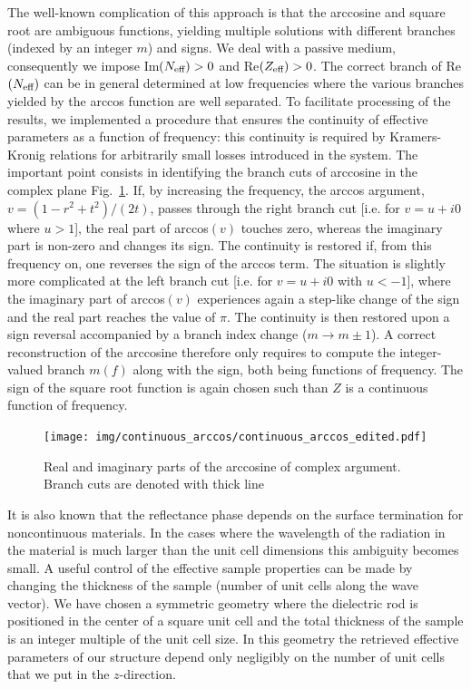 \documentclass[letterpaper,12pt]{report}
\begin{document}
The well-known complication of this approach is that the arccosine and square root are
ambiguous functions, yielding multiple solutions with different branches (indexed by an
integer $m$) and signs. We deal with a passive medium, consequently we impose
Im$(N_{\text{eff} })>0$ and Re$(Z_{\text{eff} })>0$. The correct branch of Re$(N_{\text{eff} })$ can be in general
determined at low frequencies where the various branches yielded by the arccos function
are well separated. To facilitate processing of the results, we implemented a procedure
that ensures the continuity of effective parameters as a function of frequency: this
continuity is required by Kramers-Kronig relations for arbitrarily small losses
introduced in the system. The important point consists in identifying the branch cuts of
arccosine in the complex plane Fig.\ \ref{fg_arccos}. If, by increasing the frequency,
the arccos argument, $v = (1 - r^2+t^2)/(2 t)$, 
passes through the right branch cut [i.e.
for $v= u+i 0$ where $u>1$], the real part of arccos$(v)$ touches zero, whereas the
imaginary part is non-zero and changes its sign. The continuity is restored if, from this
frequency on, one reverses the sign of the arccos term. The situation is slightly more
complicated at the left branch cut [i.e. for $v = u+i 0$ with $u<-1$], where the
imaginary part of arccos$(v)$ experiences again a step-like change of the sign and the
real part reaches the value of $\pi$. The continuity is then restored upon a sign
reversal accompanied by a branch index change ($m\rightarrow m\pm 1$). A correct
reconstruction of the arccosine therefore only requires to compute the integer-valued
branch $m(f)$ along with the sign, both being functions of frequency. The sign of the
square root function is again chosen such than $Z$ is a continuous function of frequency.

\begin{figure}[h]
\centering\texttt{[image: img/continuous\_arccos/continuous\_arccos\_edited.pdf]} \caption{Real and imaginary parts
of the arccosine of complex argument. Branch cuts are denoted with thick line}
\label{fg_arccos}
\end{figure}

It is also known that the reflectance phase depends on the surface termination for
noncontinuous materials. In the cases where the wavelength of the radiation in the
material is much larger than the unit cell dimensions this ambiguity becomes small. A
useful control of the effective sample properties can be made by changing the thickness
of the sample (number of unit cells along the wave vector). We have chosen a symmetric
geometry where the dielectric rod is positioned in the center of a square unit cell and
the total thickness of the sample is an integer multiple of the unit cell size. In this
geometry the retrieved effective parameters of our structure depend only negligibly on
the number of unit cells that we put in the $z$-direction.
\end{document}
